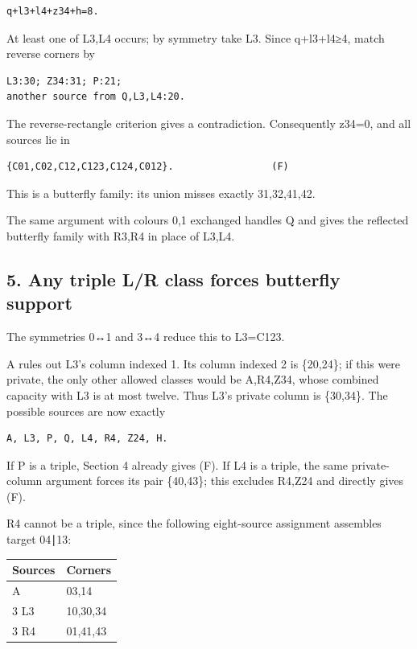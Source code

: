 \documentclass[
  10pt,
]{article}
\begin{document}
\begin{verbatim}
q+l3+l4+z34+h=8.
\end{verbatim}

At least one of L3,L4 occurs; by symmetry take L3. Since q+l3+l4≥4,
match reverse corners by

\begin{verbatim}
L3:30; Z34:31; P:21;
another source from Q,L3,L4:20.
\end{verbatim}

The reverse-rectangle criterion gives a contradiction. Consequently
z34=0, and all sources lie in

\begin{verbatim}
{C01,C02,C12,C123,C124,C012}.                 (F)
\end{verbatim}

This is a butterfly family: its union misses exactly 31,32,41,42.

The same argument with colours 0,1 exchanged handles Q and gives the
reflected butterfly family with R3,R4 in place of L3,L4.

\hypertarget{any-triple-lr-class-forces-butterfly-support}{%
\subsection*{5. Any triple L/R class forces butterfly
support}\label{any-triple-lr-class-forces-butterfly-support}}

The symmetries 0↔1 and 3↔4 reduce this to L3=C123.

A rules out L3's column indexed 1. Its column indexed 2 is \{20,24\}; if
this were private, the only other allowed classes would be A,R4,Z34,
whose combined capacity with L3 is at most twelve. Thus L3's private
column is \{30,34\}. The possible sources are now exactly

\begin{verbatim}
A, L3, P, Q, L4, R4, Z24, H.
\end{verbatim}

If P is a triple, Section 4 already gives (F). If L4 is a triple, the
same private-column argument forces its pair \{40,43\}; this excludes
R4,Z24 and directly gives (F).

R4 cannot be a triple, since the following eight-source assignment
assembles target 04∣13:

\begin{longtable}[]{@{}ll@{}}
\toprule\noalign{}
Sources & Corners \\
\midrule\noalign{}
\endhead
\bottomrule\noalign{}
\endlastfoot
2 A & 03,14 \\
3 L3 & 10,30,34 \\
3 R4 & 01,41,43 \\
\end{longtable}
\end{document}
